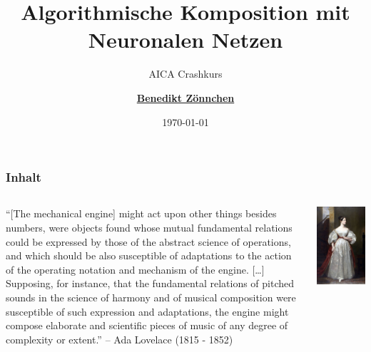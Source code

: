 \documentclass[aspectratio=169]{beamer}
\title{Algorithmische Komposition mit Neuronalen Netzen}
\subtitle{AICA Crashkurs}
\author{\href{mailto:zoennchen.benedikt@hm.edu}{\textbf{Benedikt Z\"onnchen}}}
\date{\today}
\begin{document}
	
\begin{frame}
	\titlepage
\end{frame}

\begin{frame}
	\frametitle{Inhalt}
	\tableofcontents
\end{frame}

\begin{frame}
	\begin{columns}
		\begin{column}{0.7\textwidth}
				\begin{quoting}
				``[The mechanical engine] might act upon other things besides numbers, were objects found whose mutual fundamental relations could be expressed by those of the abstract science of operations, and which should be also susceptible of adaptations to the action of the operating notation and mechanism of the engine. […] Supposing, for instance, that the fundamental relations of pitched sounds in the science of harmony and of musical composition were susceptible of such expression and adaptations, the engine might compose elaborate and scientific pieces of music of any degree of complexity or extent.'' -- Ada Lovelace (1815 - 1852)
			\end{quoting}
		\end{column}
		\begin{column}{0.3\textwidth}
			\includegraphics[width=\textwidth]{ada}

\end{column}
\end{columns}
\end{frame}
\end{document}
